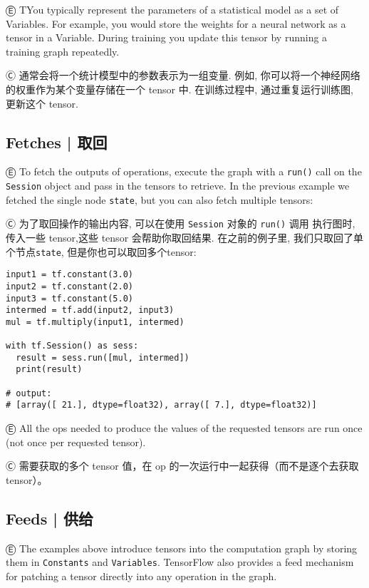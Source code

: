 Ⓔ \textcolor{etc}{TYou typically represent the parameters of a statistical model as a set of Variables. For example, you would store the weights for a neural network as a tensor in a Variable. During training you update this tensor by running a training graph repeatedly.}

Ⓒ 通常会将一个统计模型中的参数表示为一组变量. 例如, 你可以将一个神经网络的权重作为某个变量存储在一个 tensor 中. 在训练过程中, 通过重复运行训练图, 更新这个 tensor.


%
\subsection{Fetches  |  取回}

Ⓔ \textcolor{etc}{To fetch the outputs of operations, execute the graph with a \lstinline{run()} call on the \lstinline{Session} object and pass in the tensors to retrieve. In the previous example we fetched the single node \lstinline{state}, but you can also fetch multiple tensors:}

Ⓒ 为了取回操作的输出内容, 可以在使用 \lstinline{Session} 对象的 \lstinline{run()} 调用 执行图时, 传入一些 tensor,这些 tensor 会帮助你取回结果. 在之前的例子里, 我们只取回了单个节点\lstinline{state}, 但是你也可以取回多个tensor:

\begin{lstlisting}
input1 = tf.constant(3.0)
input2 = tf.constant(2.0)
input3 = tf.constant(5.0)
intermed = tf.add(input2, input3)
mul = tf.multiply(input1, intermed)

with tf.Session() as sess:
  result = sess.run([mul, intermed])
  print(result)

# output:
# [array([ 21.], dtype=float32), array([ 7.], dtype=float32)]
\end{lstlisting}

Ⓔ \textcolor{etc}{All the ops needed to produce the values of the requested tensors are run once (not once per requested tensor).}

Ⓒ 需要获取的多个 tensor 值，在 op 的一次运行中一起获得（而不是逐个去获取 tensor）。

%
\subsection{Feeds  |  供给}

Ⓔ \textcolor{etc}{The examples above introduce tensors into the computation graph by storing them in \lstinline{Constants} and \lstinline{Variables}. TensorFlow also provides a feed mechanism for patching a tensor directly into any operation in the graph.}

